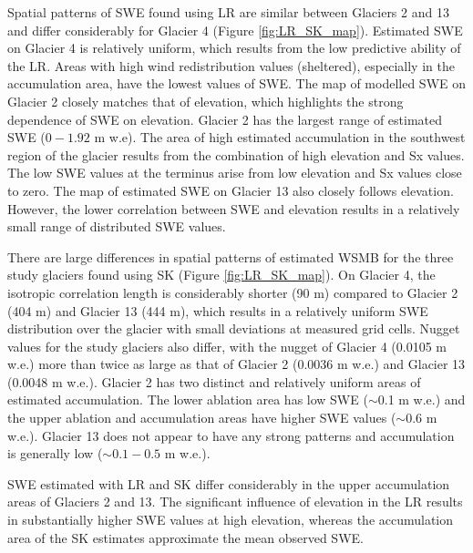 \documentclass[twocolumn,letterpaper]{igs}
\begin{document}
Spatial patterns of SWE found using LR are similar between Glaciers 2 and 13 and differ considerably for Glacier 4 (Figure \ref{fig:LR_SK_map}). Estimated SWE on Glacier 4 is relatively uniform, which results from the low predictive ability of the LR. Areas with high wind redistribution values (sheltered), especially in the accumulation area, have the lowest values of SWE. The map of modelled SWE on Glacier 2 closely matches that of elevation, which highlights the strong dependence of SWE on elevation. Glacier 2 has the largest range of estimated SWE ($0 - 1.92$ m w.e). The area of high estimated accumulation in the southwest region of the glacier  results from the combination of high elevation and Sx values. The low SWE values at the terminus arise from low elevation and Sx values close to zero. The map of estimated SWE on Glacier 13 also closely follows elevation. However, the lower correlation between SWE and elevation results in a relatively small range of distributed SWE values.

There are large differences in spatial patterns of estimated WSMB for the three study glaciers found using SK (Figure \ref{fig:LR_SK_map}). On Glacier 4, the isotropic correlation length is considerably shorter (90 m) compared to Glacier 2 (404 m) and Glacier 13 (444 m), which results in a relatively uniform SWE distribution over the glacier with small deviations at measured grid cells. Nugget values for the study glaciers also differ, with the nugget of Glacier 4 (0.0105 m w.e.) more than twice as large as that of Glacier 2 (0.0036 m w.e.) and Glacier 13 (0.0048 m w.e.). Glacier 2 has two distinct and relatively uniform areas of estimated accumulation. The lower ablation area has low SWE ($\sim$0.1 m w.e.) and the upper ablation and accumulation areas have higher SWE values ($\sim$0.6 m w.e.). Glacier 13 does not appear to have any strong patterns and accumulation is generally low ($\sim0.1-0.5$ m w.e.).

SWE estimated with LR and SK differ considerably in the upper accumulation areas of Glaciers 2 and 13. The significant influence of elevation in the LR results in substantially higher SWE values at high elevation, whereas the accumulation area of the SK estimates approximate the mean observed SWE. 
\end{document}
